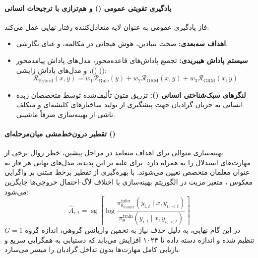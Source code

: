 \paragraph*{یادگیری تقویتی عمومی () و هم‌ترازی با ترجیحات انسانی}
فاز یادگیری عمومی به عنوان لایه متعادل‌کننده رفتار نهایی عمل می‌کند:
\begin{itemize}
    \item \textbf{اهداف سه‌بعدی:} صحت بنیادین، هوش هیجانی در مکالمه، و غنای نگارشی.
    \item \textbf{سیستم پاداش هیبریدی:} تجمیع پاداش‌های قاعده‌محور، مدل‌های پاداش پیامدمحور ()، و مدل‌های پاداش زایشی ():
    \begin{equation}
        \mathcal{R}_{\text{Hybrid}}(x, y) = w_1 \mathcal{R}_{\text{Rule}}(y) + w_2 \mathcal{R}_{\text{ORM}}(x, y) + w_3 \mathcal{R}_{\text{GRM}}(x, y)
    \end{equation}
    \item \textbf{لنگرهای سبک‌شناختی انسانی ():} تزریق متون تألیف‌شده توسط متخصصان زبده انسانی به جریان گرادیان جهت پیشگیری از تولید ساختارهای کلیشه‌ای و متکلف ناشی از بهینه‌سازی صرفاً ماشینی.
\end{itemize}

\paragraph*{تقطیر درون‌خط‌مشی میان‌مرحله‌ای ()}
بهینه‌سازی متوالی برای اهداف متعامد در مراحل پیشین، خطر زوال برخی از مهارت‌های استدلال را به همراه دارد. برای غلبه بر این پدیده، مدل‌های نهایی هر فاز به عنوان معلمان متخصص تعیین می‌شوند. با بهره‌گیری از تقطیر برخط مبتنی بر واگرایی  معکوس \cite{lu2025onpolicy}، متغیر مزیت در الگوریتم بهینه‌سازی با اختلاف لاگ-احتمال خروجی‌ها جایگزین می‌شود:
\begin{equation}
    \hat{A}_{i,t} = \operatorname{sg}\left[ \log \frac{\pi_{\theta_{\text{teacher}}}^{\text{infer}}(y_{i,t} \mid x, y_{i,<t})}{\pi_\theta^{\text{train}}(y_{i,t} \mid x, y_{i,<t})} \right]
\end{equation}
در این گام نهایی، به دلیل حذف نیاز به تخمین واریانس گروهی، اندازه گروه $G=1$ تنظیم شده و اندازه دسته داده تا ۱۰۲۴ افزایش می‌یابد که دستیابی به همگرایی سریع و بازیابی کامل مهارت‌ها بدون تداخل گرادیان را میسر می‌سازد.

